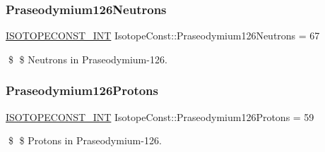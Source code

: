 \subsubsection{\texorpdfstring{Praseodymium126\+Neutrons}{Praseodymium126Neutrons}}
{\footnotesize\ttfamily \mbox{\hyperlink{group___isotope_const-_macros_ga5f18360b3e99483a35c32d789e62621c}{I\+S\+O\+T\+O\+P\+E\+C\+O\+N\+S\+T\+\_\+\+I\+NT}} Isotope\+Const\+::\+Praseodymium126\+Neutrons = 67}

\$ \$ Neutrons in Praseodymium-\/126. \mbox{\label{group___isotope_const-_praseodymium-_pr126_ga6bcacd1d7615761c96ae7edb9a2ace0a}} 
\subsubsection{\texorpdfstring{Praseodymium126\+Protons}{Praseodymium126Protons}}
{\footnotesize\ttfamily \mbox{\hyperlink{group___isotope_const-_macros_ga5f18360b3e99483a35c32d789e62621c}{I\+S\+O\+T\+O\+P\+E\+C\+O\+N\+S\+T\+\_\+\+I\+NT}} Isotope\+Const\+::\+Praseodymium126\+Protons = 59}

\$ \$ Protons in Praseodymium-\/126. 
